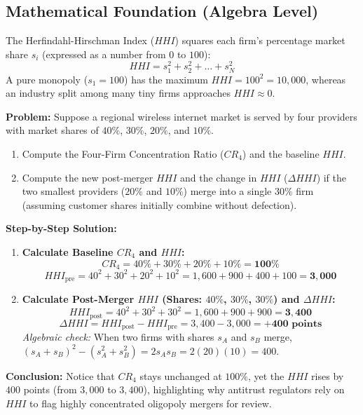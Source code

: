 \documentclass[11pt,letterpaper]{article}
\begin{document}
\subsection*{Mathematical Foundation (Algebra Level)}
The Herfindahl-Hirschman Index ($HHI$) squares each firm's percentage market share $s_i$ (expressed as a number from $0$ to $100$):
\begin{equation}
HHI = s_1^2 + s_2^2 + \dots + s_N^2
\end{equation}
A pure monopoly ($s_1 = 100$) has the maximum $HHI = 100^2 = 10{,}000$, whereas an industry split among many tiny firms approaches $HHI \approx 0$.

\begin{tcolorbox}[colback=LightSlate,colframe=CourseTeal,title=\textbf{Work It Out: Measuring Concentration and Evaluating a Horizontal Merger}]
\noindent\textbf{Problem:}
Suppose a regional wireless internet market is served by four providers with market shares of $40\%$, $30\%$, $20\%$, and $10\%$.
\begin{enumerate}
    \item Compute the Four-Firm Concentration Ratio ($CR_4$) and the baseline $HHI$.
    \item Compute the new post-merger $HHI$ and the change in $HHI$ ($\Delta HHI$) if the two smallest providers ($20\%$ and $10\%$) merge into a single $30\%$ firm (assuming customer shares initially combine without defection).
\end{enumerate}

\noindent\textbf{Step-by-Step Solution:}
\begin{enumerate}
    \item \textbf{Calculate Baseline $CR_4$ and $HHI$:}
    \[
    CR_4 = 40\% + 30\% + 20\% + 10\% = \mathbf{100\%}
    \]
    \[
    HHI_{\text{pre}} = 40^2 + 30^2 + 20^2 + 10^2 = 1{,}600 + 900 + 400 + 100 = \mathbf{3{,}000}
    \]

    \item \textbf{Calculate Post-Merger $HHI$ (Shares: $40\%$, $30\%$, $30\%$) and $\Delta HHI$:}
    \[
    HHI_{\text{post}} = 40^2 + 30^2 + 30^2 = 1{,}600 + 900 + 900 = \mathbf{3{,}400}
    \]
    \[
    \Delta HHI = HHI_{\text{post}} - HHI_{\text{pre}} = 3{,}400 - 3{,}000 = \mathbf{+400\text{ points}}
    \]
    \emph{Algebraic check:} When two firms with shares $s_A$ and $s_B$ merge, $(s_A + s_B)^2 - (s_A^2 + s_B^2) = 2 s_A s_B = 2(20)(10) = 400$.
\end{enumerate}
\textbf{Conclusion:} Notice that $CR_4$ stays unchanged at $100\%$, yet the $HHI$ rises by $400$ points (from $3{,}000$ to $3{,}400$), highlighting why antitrust regulators rely on $HHI$ to flag highly concentrated oligopoly mergers for review.
\end{tcolorbox}
\end{document}
